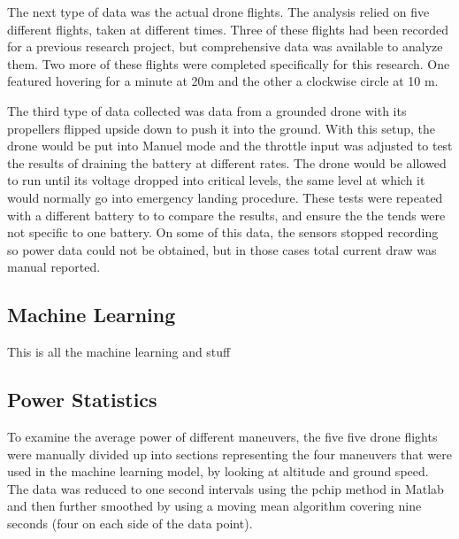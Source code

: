 \documentclass{article}
\begin{document}
The next type of data was the actual drone flights. The analysis relied on five different flights, taken at different times. Three of these flights had been recorded for a previous research project, but comprehensive data was available to analyze them. Two more of these flights were completed specifically for this research. One featured hovering for a minute at 20m and the other a clockwise circle at 10 m.\par

The third type of data collected was data from a grounded drone with its propellers flipped upside  down to push it into the ground. With this setup, the drone would be put into Manuel mode and the throttle input was adjusted to test the results of draining the battery at different rates. The drone would be allowed to run until its voltage dropped into critical levels, the same level at which it would normally go into emergency landing procedure. These tests were repeated with a different battery to to compare the results, and ensure the the tends were not specific to one battery. On some of this data, the sensors stopped recording so power data could not be obtained, but in those cases total current draw was manual reported.






\subsection{Machine Learning}
This is all the machine learning and stuff


\subsection{Power Statistics}
To examine the average power of different maneuvers, the five five drone flights were manually divided up into sections representing the four maneuvers that were used in the machine learning model, by looking at altitude and ground speed. The data was reduced to one second intervals using the pchip method in Matlab and then further smoothed by using a moving mean algorithm covering nine seconds (four on each side of the data point).\par
\end{document}
